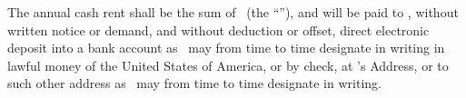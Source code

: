 The annual cash rent shall be the sum of \annualcashamount\ (the “\annualcashrent”), and will be paid to \lessor, without written notice or demand, and without deduction or offset, direct electronic deposit into a bank account as \lessor\ may from time to time designate in writing in lawful money of the United States of America, or by check, at \lessor’s Address, or to such other address as \lessor\ may from time to time designate in writing.
